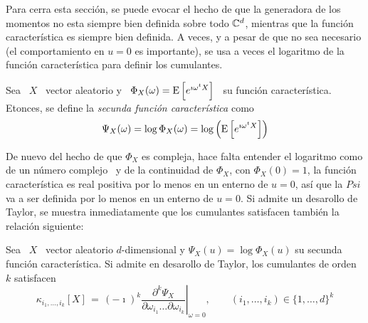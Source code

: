 {Para cerra esta secci\'on, se puede evocar  el hecho de que la generadora de los
momentos no  esta siempre  bien definida sobre  todo $\mathbb{C}^d$, mientras  que la
funci\'on caracter\'istica es  siempre bien definida. A veces, y  a pesar de que
no sea necesario  (el comportamiento en $u=0$ es importante), se  usa a veces el
logaritmo de la funci\'on caracter\'istica para definir los cumulantes.
%
\begin{definicion}
  Sea  \ $X$  \  vector aleatorio  y  \ $\Phi_X(\omega)  = \operatorname{E}\left[  e^{\imath
      \omega^t X}  \right]$ \ su funci\'on caracter\'istica.  Etonces, se define
  la {\em secunda funci\'on caracter\'istica} como
  \[
  \Psi_X(\omega)  =  \log   \Phi_X(\omega)  =  \log\left(  \operatorname{E}\left[  e^{\imath
        \omega^t X} \right] \right)
  \]
\end{definicion}
%
De nuevo del hecho de que $\Phi_X$ es compleja, hace falta entender el logaritmo
como  de un  n\'umero complejo~\cite{Abl03,  CarKro05}  y de  la continuidad  de
$\Phi_X$, con  $\Phi_X(0) = 1$,  la funci\'on caracter\'istica es  real positiva
por lo menos en un enterno de $u =  0$, as\'i que la $Psi$ va a ser definida por
lo menos en un enterno de $u =  0$. Si admite un desarollo de Taylor, se muestra
inmediatamente que los cumulantes satisfacen tambi\'en la relaci\'on siguiente:
%
\begin{lema}\label{Lem:MP:CumSecFctCarac}
%
  Sea \ $X$ \ vector aleatorio $d$-dimensional y $\Psi_X(u) = \log \Phi_X(u)$ su
  secunda  funci\'on caracter\'istica.  Si  admite en  desarollo de  Taylor, los
  cumulantes de orden $k$ satisfacen
  \[
  \kappa_{i_1,\ldots,i_k}[X]    \,   =   \,    (-\imath)^k   \left.\frac{\partial^k
      \Psi_X}{\partial    \omega_{i_1}    \ldots   \partial    \omega_{i_k}}
  \right|_{\omega   =    0},   \qquad    (i_1 , \ldots , i_k) \in \{ 1 , \ldots , d \}^k
  \]
\end{lema}


}
